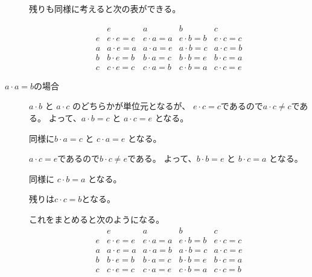 \documentclass[12pt,b5paper]{ltjsarticle}
\begin{document}
\begin{description}
             残りも同様に考えると次の表ができる。
             
             \begin{equation}
              \begin{array}{c|cccc}
                & e & a & b & c \\
               \hline
               e & e\cdot e = e & e\cdot a = a & e\cdot b=b & e\cdot c =c \\
               a & a\cdot e = a & a\cdot a = e & a\cdot b=c & a\cdot c =b \\
               b & b\cdot e = b & b\cdot a = c & b\cdot b=e & b\cdot c = a\\
               c & c\cdot e = c & c\cdot a = b & c\cdot b=a & c\cdot c = e
              \end{array}
              \label{eq:z2z2}
             \end{equation}


 \item [$a\cdot a=b$の場合]

             $a\cdot b$ と $a\cdot c$ のどちらかが単位元となるが、
             $e\cdot c =c$であるので$a\cdot c\ne c$である。
             よって、$a\cdot b=c$ と $a\cdot c=e$ となる。

             同様に$b\cdot a=c$ と $c\cdot a=e$ となる。

             $a\cdot c =e$であるので$b\cdot c\ne e$である。
             よって、$b\cdot b=e$ と $b\cdot c=a$ となる。

             同様に $c\cdot b=a$ となる。

             残りは$c\cdot c = b$となる。

             これをまとめると次のようになる。
             \begin{equation}
              \begin{array}{c|cccc}
                & e & a & b & c \\
               \hline
               e & e\cdot e = e & e\cdot a = a & e\cdot b=b & e\cdot c =c \\
               a & a\cdot e = a & a\cdot a = b & a\cdot b=c & a\cdot c =e \\
               b & b\cdot e = b & b\cdot a =c  & b\cdot b=e & b\cdot c =a \\
               c & c\cdot e = c & c\cdot a =e  & c\cdot b=a & c\cdot c = b
              \end{array}
              \label{eq:z4}
             \end{equation}

\end{description}
\end{document}
